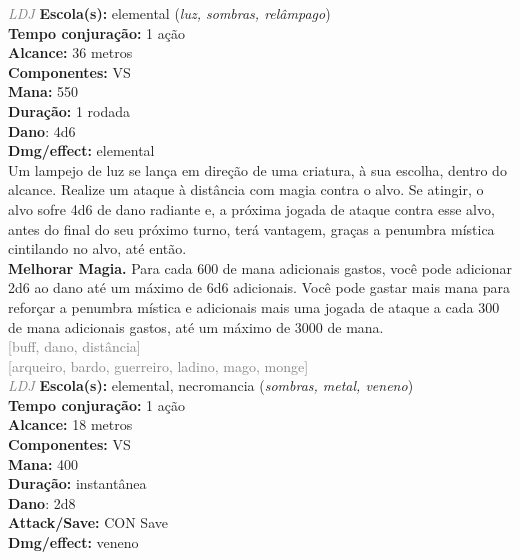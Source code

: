 \documentclass{RPG_Adventure}[2021/10/20]
\begin{document}
{\tiny \textcolor{gray}{\textit{LDJ}}}\jump{}
{\small \t \textbf{Escola(s):} elemental (\textit{luz, sombras, relâmpago})\\\t \textbf{Tempo conjuração:} 1 ação\\\t \textbf{Alcance:} 36 metros\\\t \textbf{Componentes:} VS\\\t \textbf{Mana:} 550\\\t \textbf{Duração:} 1 rodada\\\t \textbf{Dano}: 4d6\\\t \textbf{Dmg/effect:} elemental\\}
{\normalsize Um lampejo de luz se lança em direção de uma criatura, à sua escolha, dentro do alcance. Realize um ataque à distância com magia contra o alvo. Se atingir, o alvo sofre 4d6 de dano radiante e, a próxima jogada de ataque contra esse alvo, antes do final do seu próximo turno, terá vantagem, graças a penumbra mística cintilando no alvo, até então.\\\t \textbf{Melhorar Magia.} Para cada 600 de mana adicionais gastos, você pode adicionar 2d6 ao dano até um máximo de 6d6 adicionais. Você pode gastar mais mana para reforçar a penumbra mística e adicionais mais uma jogada de ataque a cada 300 de mana adicionais gastos, até um máximo de 3000 de mana.\\}
{\scriptsize \textcolor{gray}{[buff, dano, distância]\\}}
{\scriptsize \textcolor{gray}{[arqueiro, bardo, guerreiro, ladino, mago, monge]\\}}
{\tiny \textcolor{gray}{\textit{LDJ}}}\jump{}
{\small \t \textbf{Escola(s):} elemental, necromancia (\textit{sombras, metal, veneno})\\\t \textbf{Tempo conjuração:} 1 ação\\\t \textbf{Alcance:} 18 metros\\\t \textbf{Componentes:} VS\\\t \textbf{Mana:} 400\\\t \textbf{Duração:} instantânea\\\t \textbf{Dano}: 2d8\\\t \textbf{Attack/Save:} CON Save\\\t \textbf{Dmg/effect:} veneno\\}
\end{document}
